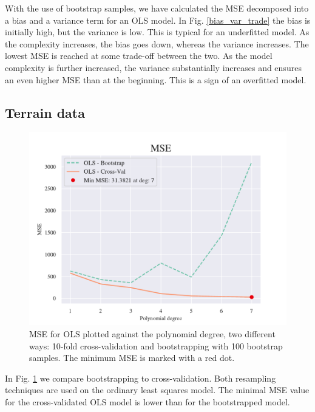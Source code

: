 With the use of bootstrap samples, we have calculated the MSE decomposed into a bias and a variance term for an OLS model. 
In Fig. \ref{bias_var_trade} the bias is initially high, but the variance is low. 
This is typical for an underfitted model. As the complexity increases, the bias goes down, whereas the variance increases. 
The lowest MSE is reached at some trade-off between the two. 
As the model complexity is further increased, the variance substantially increases and ensures an even higher MSE than at the beginning. 
This is a sign of an overfitted model.


\subsection{Terrain data}

\begin{figure}[h!]
    \centering
    \includegraphics[width=1\linewidth]{project_1/figures/figures_in_report/CV_BS_OLS_terrain.pdf}
    \caption{MSE for OLS plotted against the polynomial degree, two different ways: 10-fold cross-validation and bootstrapping with 100 bootstrap samples. The minimum MSE is marked with a red dot.}
    \label{cv_versus_bs}
\end{figure}

In Fig. \ref{cv_versus_bs} we compare bootstrapping to cross-validation. 
Both resampling techniques are used on the ordinary least squares model. 
The minimal MSE value for the cross-validated OLS model is lower than for the bootstrapped model. 

